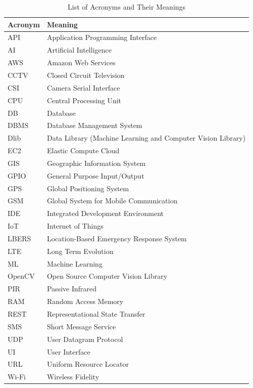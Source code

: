 \documentclass[12pt,a4paper,oneside]{report}
\begin{document}
\begin{table}[htbp]
  \centering
  \caption{List of Acronyms and Their Meanings}
  {\small
  \begin{tabular}{|p{2.79cm}|p{10.00cm}|}
    \hline
    \textbf{Acronym} & \textbf{Meaning} \\
    \hline
    API    & Application Programming Interface \\
    AI     & Artificial Intelligence \\
    AWS    & Amazon Web Services \\
    CCTV   & Closed Circuit Television \\
    CSI    & Camera Serial Interface \\
    CPU    & Central Processing Unit \\
    DB     & Database \\
    DBMS   & Database Management System \\
    Dlib   & Data Library (Machine Learning and Computer Vision Library) \\
    EC2    & Elastic Compute Cloud \\
    GIS    & Geographic Information System \\
    GPIO   & General Purpose Input/Output \\
    GPS    & Global Positioning System \\
    GSM    & Global System for Mobile Communication \\
    IDE    & Integrated Development Environment \\
    IoT    & Internet of Things \\
    LBERS  & Location-Based Emergency Response System \\
    LTE    & Long Term Evolution \\
    ML     & Machine Learning \\
    OpenCV & Open Source Computer Vision Library \\
    PIR    & Passive Infrared \\
    RAM    & Random Access Memory \\
    REST   & Representational State Transfer \\
    SMS    & Short Message Service \\
    UDP    & User Datagram Protocol \\
    UI     & User Interface \\
    URL    & Uniform Resource Locator \\
    Wi-Fi  & Wireless Fidelity \\
    \hline
  \end{tabular}
  }
\end{table}
\end{document}
